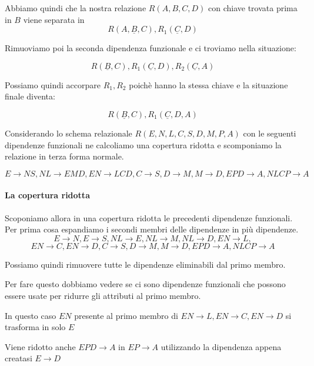 \begin{exmp}
    Abbiamo quindi che la nostra relazione $R(A,B,C,D)$ con chiave trovata prima in $B$ viene separata in
    \[R(A,\underline{B},C) , R_1(\underline{C},D)\]

    Rimuoviamo poi la seconda dipendenza funzionale e ci troviamo nella situazione:

    \[R(\underline{B},C) , R_1(\underline{C},D), R_2(\underline{C},A)\]

    Possiamo quindi accorpare $R_1,R_2$ poichè hanno la stessa chiave e la situazione finale diventa:

    \[R(\underline{B},C), R_1(\underline{C},D,A)\]

\end{exmp}

\begin{exmp}
    Considerando lo schema relazionale $R(E,N,L,C,S,D,M,P,A)$ con le seguenti dipendenze funzionali ne calcoliamo una copertura ridotta e scomponiamo la relazione in terza forma normale.

    \[E \rightarrow NS, NL \rightarrow EMD, EN \rightarrow LCD, C \rightarrow S, D \rightarrow M, M \rightarrow D, EPD \rightarrow A, NLCP \rightarrow A\]

    \paragraph{La copertura ridotta}
    Scoponiamo allora in una copertura ridotta le precedenti dipendenze funzionali. Per prima cosa espandiamo i secondi membri delle dipendenze in più dipendenze.
    \[
    E \rightarrow N,
    E \rightarrow S,
    NL \rightarrow E,
    NL \rightarrow M,
    NL \rightarrow D,
    EN \rightarrow L,
    \]
    \[
    EN \rightarrow C,
    EN \rightarrow D,
    C \rightarrow S,
    D \rightarrow M,
    M \rightarrow D,
    EPD \rightarrow A,
    NLCP \rightarrow A
    \]

    Possiamo quindi rimuovere tutte le dipendenze eliminabili dal primo membro.

    Per fare questo dobbiamo vedere se ci sono dipendenze funzionali che possono essere usate per ridurre gli attributi al primo membro.

    In questo caso $EN$ presente al primo membro di $ EN \rightarrow L,
    EN \rightarrow C,
    EN \rightarrow D$ si trasforma in solo $E$

    Viene ridotto anche $EPD \rightarrow A $ in $ EP \rightarrow A$ utilizzando la dipendenza appena creatasi $E \rightarrow D$


\end{exmp}
